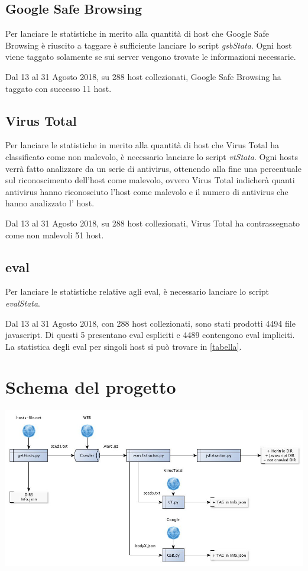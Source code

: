 \documentclass[a4paper, 11pt, oneside]{report}
\begin{document}
\subsection{Google Safe Browsing}
Per lanciare le statistiche in merito alla quantità di host che Google Safe Browsing è riuscito a taggare è sufficiente lanciare lo script \textit{gsbStata}. Ogni host viene taggato solamente se sui server vengono trovate le informazioni necessarie. 

Dal 13 al 31 Agosto 2018, su 288 host collezionati, Google Safe Browsing ha taggato con successo 11 host. 

\subsection{Virus Total}
Per lanciare le statistiche in merito alla quantità di host che Virus Total ha classificato come non malevolo, è necessario lanciare lo script \textit{vtStata}. Ogni hosts verrà fatto analizzare da un serie di antivirus, ottenendo alla fine una percentuale sul riconoscimento dell'host come malevolo, ovvero Virus Total indicherà quanti antivirus hanno riconosciuto l'host come malevolo e il numero di  antivirus che hanno analizzato l' host.

Dal 13 al 31 Agosto 2018, su 288 host collezionati, Virus Total ha contrassegnato come non malevoli 51 host.

\subsection{eval}
Per lanciare le statistiche relative agli eval, è necessario lanciare lo script \textit{evalStata}.

Dal 13 al 31 Agosto 2018, con 288 host collezionati, sono stati prodotti 4494 file javascript. Di questi 5 presentano eval espliciti e 4489 contengono eval impliciti.
La statistica degli eval per singoli host si può trovare in \ref{tabella}.

\section{Schema del progetto}
\includegraphics[scale=0.7]{schema}
\end{document}
